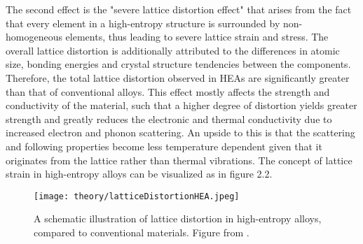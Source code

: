The second effect is the "severe lattice distortion effect" that arises from the fact that every element in a high-entropy structure is surrounded by non-homogeneous elements, thus leading to severe lattice strain and stress. The overall lattice distortion is additionally attributed to the differences in atomic size, bonding energies and crystal structure tendencies between the components. Therefore, the total lattice distortion observed in HEAs are significantly greater than that of conventional alloys. This effect mostly affects the strength and conductivity of the material, such that a higher degree of distortion yields greater strength and greatly reduces the electronic and thermal conductivity due to increased electron and phonon scattering. An upside to this is that the scattering and following properties become less temperature dependent given that it originates from the lattice rather than thermal vibrations. The concept of lattice strain in high-entropy alloys can be visualized as in figure 2.2.

\begin{figure} 
\centering
\texttt{[image: theory/latticeDistortionHEA.jpeg]}
\caption{A schematic illustration of lattice distortion in high-entropy alloys, compared to conventional materials. Figure from \cite{owen_jones_2018}.}
\end{figure}
 
